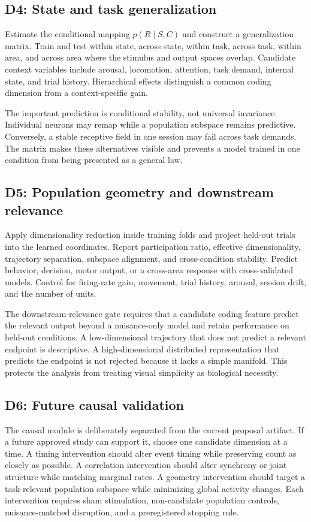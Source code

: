 \documentclass[conference]{IEEEtran}
\begin{document}
\subsection{D4: State and task generalization}
Estimate the conditional mapping $p(R\mid S,C)$ and construct a generalization matrix. Train and test within state, across state, within task, across task, within area, and across area where the stimulus and output spaces overlap. Candidate context variables include arousal, locomotion, attention, task demand, internal state, and trial history. Hierarchical effects distinguish a common coding dimension from a context-specific gain.

The important prediction is conditional stability, not universal invariance. Individual neurons may remap while a population subspace remains predictive. Conversely, a stable receptive field in one session may fail across task demands. The matrix makes these alternatives visible and prevents a model trained in one condition from being presented as a general law.

\subsection{D5: Population geometry and downstream relevance}
Apply dimensionality reduction inside training folds and project held-out trials into the learned coordinates. Report participation ratio, effective dimensionality, trajectory separation, subspace alignment, and cross-condition stability. Predict behavior, decision, motor output, or a cross-area response with cross-validated models. Control for firing-rate gain, movement, trial history, arousal, session drift, and the number of units.

The downstream-relevance gate requires that a candidate coding feature predict the relevant output beyond a nuisance-only model and retain performance on held-out conditions. A low-dimensional trajectory that does not predict a relevant endpoint is descriptive. A high-dimensional distributed representation that predicts the endpoint is not rejected because it lacks a simple manifold. This protects the analysis from treating visual simplicity as biological necessity.

\subsection{D6: Future causal validation}
The causal module is deliberately separated from the current proposal artifact. If a future approved study can support it, choose one candidate dimension at a time. A timing intervention should alter event timing while preserving count as closely as possible. A correlation intervention should alter synchrony or joint structure while matching marginal rates. A geometry intervention should target a task-relevant population subspace while minimizing global activity changes. Each intervention requires sham stimulation, non-candidate population controls, nuisance-matched disruption, and a preregistered stopping rule.
\end{document}
